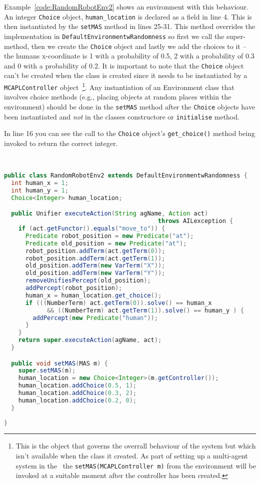Example~\ref{code:RandomRobotEnv2} shows an environment with this behaviour.  An integer \texttt{Choice} object, \texttt{human\_location} is declared as a field in line 4.  This is then instantiated by the \texttt{setMAS} method in lines 25-31.  This method overrides the implementation in \texttt{DefaultEnvironmentwRandomness} so first we call the super-method, then we create the \texttt{Choice} object and lastly we add the choices to it -- the humans x-coordinate is 1 with a probability of 0.5, 2 with a probability of 0.3 and 0 with a probability of 0.2.  It is important to note that the \texttt{Choice} object can't be created when the class is created since it needs to be instantiated by a \texttt{MCAPLController} object~\footnote{This is the object that governs the overrall behaviour of the system but which isn't available when the class it created.  As part of setting up a multi-agent system in the \ail\ the \texttt{setMAS(MCAPLController m)} from the environment will be invoked at a suitable moment after the controller has been created.}.  Any instantiation of an Environment class that involves choice methods (e.g., placing objects at random places within the environment) should be done in the \texttt{setMAS} method after the \texttt{Choice} objects have been instantiated and \emph{not} in the classes constructore or \texttt{initialise} method.

In line 16 you can see the call to the \texttt{Choice} object's \texttt{get\_choice()} method being invoked to return the correct integer.
\begin{ourexample}
\label{code:RandomRobotEnv2} \quad \\
\begin{lstlisting}[basicstyle=\sffamily,language=Java,style=easslisting]
public class RandomRobotEnv2 extends DefaultEnvironmentwRandomness {
  int human_x = 1;
  int human_y = 1;
  Choice<Integer> human_location;

  public Unifier executeAction(String agName, Action act) 
                                           throws AILexception {
    if (act.getFunctor().equals("move_to")) {
      Predicate robot_position = new Predicate("at");
      Predicate old_position = new Predicate("at");
      robot_position.addTerm(act.getTerm(0));
      robot_position.addTerm(act.getTerm(1));
      old_position.addTerm(new VarTerm("X"));
      old_position.addTerm(new VarTerm("Y"));
      removeUnifiesPercept(old_position);
      addPercept(robot_position);
      human_x = human_location.get_choice();
      if (((NumberTerm) act.getTerm(0)).solve() == human_x 
            && ((NumberTerm) act.getTerm(1)).solve() == human_y ) {
        addPercept(new Predicate("human"));
      }
    }
    return super.executeAction(agName, act);
  }

  public void setMAS(MAS m) {
    super.setMAS(m);
    human_location = new Choice<Integer>(m.getController());
    human_location.addChoice(0.5, 1);
    human_location.addChoice(0.3, 2);
    human_location.addChoice(0.2, 0);
  }
	      
}
\end{lstlisting}
\end{ourexample}

